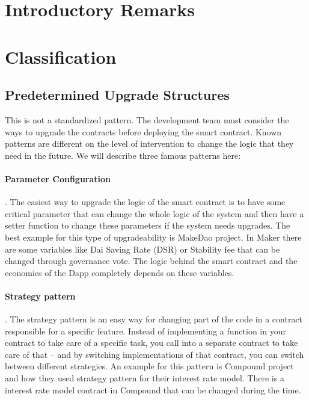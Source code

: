 

\section{Introductory Remarks}



\section{Classification}
\subsection{Predetermined Upgrade Structures}
This is not a standardized pattern. The development team must consider the ways to upgrade the contracts before deploying the smart contract. Known patterns are different on the level of intervention to change the logic that they need in the future. We will describe three famous patterns here:

\paragraph{Parameter Configuration}. The easiest way to upgrade the logic of the smart contract is to have some critical parameter that can change the whole logic of the system and then have a setter function to change these parameters if the system needs upgrades. The best example for this type of upgradeability is MakeDao project. In Maker there are some variables like Dai Saving Rate (DSR) or Stability fee that can be changed through governance vote. The logic behind the smart contract and the economics of the Dapp completely depends on these variables.

\paragraph{Strategy pattern}. The strategy pattern is an easy way for changing part of the code in a contract responsible for a specific feature. Instead of implementing a function in your contract to take care of a specific task, you call into a separate contract to take care of that – and by switching implementations of that contract, you can switch between different strategies.
An example for this pattern is Compound project and how they used strategy pattern for their interest rate model. There is a interest rate model contract in Compound that can be changed during the time. 

